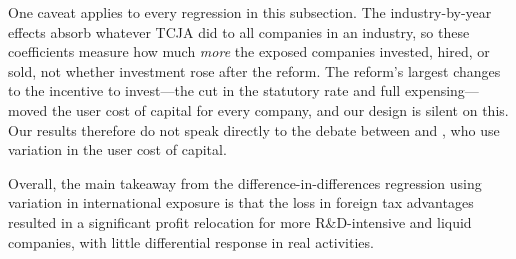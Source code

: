 \documentclass[11pt,letterpaper]{article}
\begin{document}
One caveat applies to every regression in this subsection. The
industry-by-year effects absorb whatever TCJA did to all companies in
an industry, so these coefficients measure how much \emph{more} the
exposed companies invested, hired, or sold, not whether investment rose
after the reform. The reform's largest changes to the incentive to
invest---the cut in the statutory rate and full expensing---moved the
user cost of capital for every company, and our design is silent on this.
Our results therefore do not speak directly to the debate between
\citet{CSZZ2024} and \citet{GravelleMarples2025}, who use variation in
the user cost of capital.

Overall, the main takeaway from the difference-in-differences regression
using variation in international exposure is that the loss in foreign tax
advantages resulted in a significant profit relocation for more R\&D-intensive and
liquid companies, with little differential response in real activities.


%
%
\end{document}
